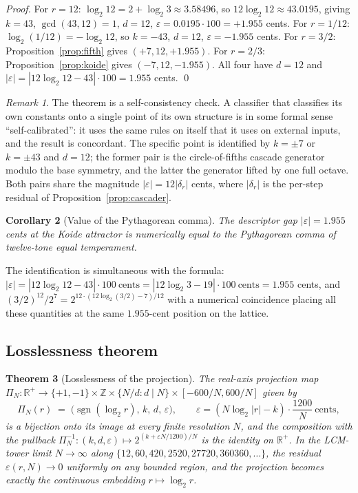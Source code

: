 \documentclass[11pt,a4paper]{article}
\newtheorem{theorem}{Theorem}[section]
\newtheorem{corollary}[theorem]{Corollary}
\theoremstyle{definition}
\theoremstyle{remark}
\newtheorem{remark}[theorem]{Remark}
\newcommand{\R}{\mathbb{R}}
\newcommand{\Z}{\mathbb{Z}}
\newcommand{\eps}{\varepsilon}
\begin{document}
\begin{proof}
For $r=12$: $\log_{2}12 = 2 + \log_{2}3 \approx 3.58496$, so $12\log_{2}12 \approx 43.0195$, giving $k=43$, $\gcd(43,12)=1$, $d=12$, $\eps = 0.0195\cdot 100 = +1.955$ cents. For $r=1/12$: $\log_{2}(1/12) = -\log_{2}12$, so $k=-43$, $d=12$, $\eps = -1.955$ cents. For $r=3/2$: Proposition~\ref{prop:fifth} gives $(+7,12,+1.955)$. For $r=2/3$: Proposition~\ref{prop:koide} gives $(-7,12,-1.955)$. All four have $d=12$ and $|\eps| = |12\log_{2}12 - 43|\cdot 100 = 1.955$ cents. \qed
\end{proof}

\begin{remark}
The theorem is a self-consistency check. A classifier that classifies its own constants onto a single point of its own structure is in some formal sense ``self-calibrated'': it uses the same rules on itself that it uses on external inputs, and the result is concordant. The specific point is identified by $k=\pm 7$ or $k=\pm 43$ and $d=12$; the former pair is the circle-of-fifths cascade generator modulo the base symmetry, and the latter the generator lifted by one full octave. Both pairs share the magnitude $|\eps| = 12|\delta_{r}|$ cents, where $|\delta_{r}|$ is the per-step residual of Proposition~\ref{prop:cascader}.
\end{remark}

\begin{corollary}[Value of the Pythagorean comma]\label{cor:comma}
The descriptor gap $|\eps|=1.955$ cents at the Koide attractor is numerically equal to the Pythagorean comma of twelve-tone equal temperament.
\end{corollary}

The identification is simultaneous with the formula: $|\eps| = |12\log_{2}12 - 43| \cdot 100\ \text{cents} = |12\log_{2}3 - 19|\cdot 100\ \text{cents} = 1.955$ cents, and $(3/2)^{12}/2^{7} = 2^{12\cdot(12\log_{2}(3/2)-7)/12}$ with a numerical coincidence placing all these quantities at the same $1.955$-cent position on the lattice.

\subsection{Losslessness theorem}

\begin{theorem}[Losslessness of the projection]\label{thm:lossless}
The real-axis projection map $\Pi_{N}: \R^{+} \to \{+1,-1\}\times\Z\times\{N/d : d\mid N\}\times[-600/N, 600/N]$ given by
\[
\Pi_{N}(r) \;=\; \bigl(\operatorname{sgn}(\log_{2} r),\, k,\, d,\, \varepsilon\bigr), \qquad \varepsilon = (N\log_{2}|r| - k)\cdot\frac{1200}{N}\ \text{cents},
\]
is a bijection onto its image at every finite resolution $N$, and the composition with the pullback $\Pi_{N}^{-1}:(k,d,\varepsilon)\mapsto 2^{(k + \varepsilon N / 1200)/N}$ is the identity on $\R^{+}$. In the LCM-tower limit $N\to\infty$ along $\{12, 60, 420, 2520, 27720, 360360, \ldots\}$, the residual $\varepsilon(r,N)\to 0$ uniformly on any bounded region, and the projection becomes exactly the continuous embedding $r \mapsto \log_{2}r$.
\end{theorem}
\end{document}
